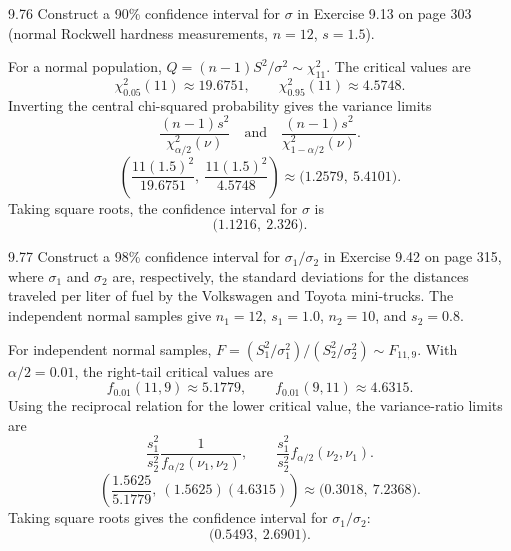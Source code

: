 \documentclass[11pt,oneside]{article}
\begin{document}
\begin{exercise}{9.76}
Construct a 90\% confidence interval for $\sigma$ in Exercise 9.13 on page 303 (normal Rockwell hardness measurements, $n=12$, $s=1.5$).
\end{exercise}
\begin{solution}
For a normal population, $Q=(n-1)S^2/\sigma^2\sim\chi^2_{11}$. The critical values are
\[
\chi^2_{0.05}(11)\approx19.6751,\qquad\chi^2_{0.95}(11)\approx4.5748.
\]
Inverting the central chi-squared probability gives the variance limits
\[
\frac{(n-1)s^2}{\chi^2_{\alpha/2}(\nu)}\quad\text{and}\quad\frac{(n-1)s^2}{\chi^2_{1-\alpha/2}(\nu)}.
\]
\[
\left(\frac{11(1.5)^2}{19.6751},\ \frac{11(1.5)^2}{4.5748}\right)\approx\bigl(1.2579,\ 5.4101\bigr).
\]
Taking square roots, the confidence interval for $\sigma$ is
\[
\boxed{\bigl(1.1216,\ 2.326\bigr)}.
\]
\end{solution}

\begin{exercise}{9.77}
Construct a 98\% confidence interval for $\sigma_1/\sigma_2$ in Exercise 9.42 on page 315, where $\sigma_1$ and $\sigma_2$ are, respectively, the standard deviations for the distances traveled per liter of fuel by the Volkswagen and Toyota mini-trucks. The independent normal samples give $n_1=12$, $s_1=1.0$, $n_2=10$, and $s_2=0.8$.
\end{exercise}
\begin{solution}
For independent normal samples, $F=(S_1^2/\sigma_1^2)/(S_2^2/\sigma_2^2)\sim F_{11,9}$. With $\alpha/2=0.01$, the right-tail critical values are
\[
f_{0.01}(11,9)\approx5.1779,\qquad f_{0.01}(9,11)\approx4.6315.
\]
Using the reciprocal relation for the lower critical value, the variance-ratio limits are
\[
\frac{s_1^2}{s_2^2}\frac1{f_{\alpha/2}(\nu_1,\nu_2)},\qquad\frac{s_1^2}{s_2^2}f_{\alpha/2}(\nu_2,\nu_1).
\]
\[
\left(\frac{1.5625}{5.1779},\ (1.5625)(4.6315)\right)\approx\bigl(0.3018,\ 7.2368\bigr).
\]
Taking square roots gives the confidence interval for $\sigma_1/\sigma_2$:
\[
\boxed{\bigl(0.5493,\ 2.6901\bigr)}.
\]
\end{solution}
\end{document}
